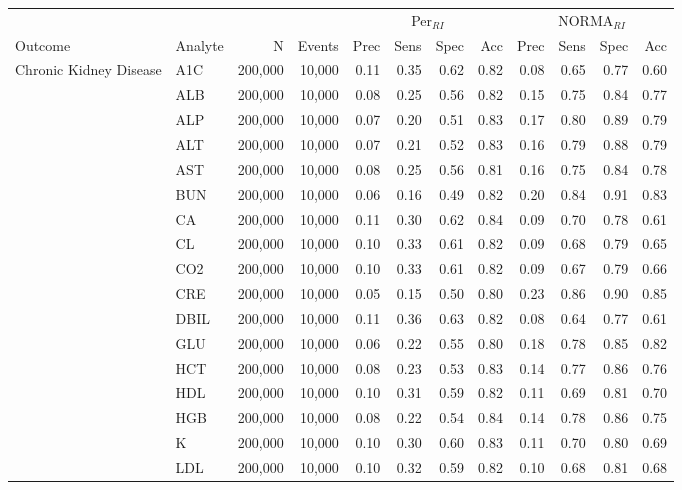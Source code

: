 \begin{table}[ht]
\centering
\footnotesize
\begin{tabular}{llrrrrrrrrrr}
\toprule
 & & &  & \multicolumn{4}{c}{Per$_{RI}$} & \multicolumn{4}{c}{NORMA$_{RI}$} \\
\cmidrule(lr){5-8} \cmidrule(lr){9-12}
Outcome & Analyte & N & Events & Prec & Sens & Spec & Acc & Prec & Sens & Spec & Acc \\
\midrule
Chronic Kidney Disease & A1C & 200,000 & 10,000 & 0.11 & 0.35 & 0.62 & 0.82 & 0.08 & 0.65 & 0.77 & 0.60 \\
 & ALB & 200,000 & 10,000 & 0.08 & 0.25 & 0.56 & 0.82 & 0.15 & 0.75 & 0.84 & 0.77 \\
 & ALP & 200,000 & 10,000 & 0.07 & 0.20 & 0.51 & 0.83 & 0.17 & 0.80 & 0.89 & 0.79 \\
 & ALT & 200,000 & 10,000 & 0.07 & 0.21 & 0.52 & 0.83 & 0.16 & 0.79 & 0.88 & 0.79 \\
 & AST & 200,000 & 10,000 & 0.08 & 0.25 & 0.56 & 0.81 & 0.16 & 0.75 & 0.84 & 0.78 \\
 & BUN & 200,000 & 10,000 & 0.06 & 0.16 & 0.49 & 0.82 & 0.20 & 0.84 & 0.91 & 0.83 \\
 & CA & 200,000 & 10,000 & 0.11 & 0.30 & 0.62 & 0.84 & 0.09 & 0.70 & 0.78 & 0.61 \\
 & CL & 200,000 & 10,000 & 0.10 & 0.33 & 0.61 & 0.82 & 0.09 & 0.68 & 0.79 & 0.65 \\
 & CO2 & 200,000 & 10,000 & 0.10 & 0.33 & 0.61 & 0.82 & 0.09 & 0.67 & 0.79 & 0.66 \\
 & CRE & 200,000 & 10,000 & 0.05 & 0.15 & 0.50 & 0.80 & 0.23 & 0.86 & 0.90 & 0.85 \\
 & DBIL & 200,000 & 10,000 & 0.11 & 0.36 & 0.63 & 0.82 & 0.08 & 0.64 & 0.77 & 0.61 \\
 & GLU & 200,000 & 10,000 & 0.06 & 0.22 & 0.55 & 0.80 & 0.18 & 0.78 & 0.85 & 0.82 \\
 & HCT & 200,000 & 10,000 & 0.08 & 0.23 & 0.53 & 0.83 & 0.14 & 0.77 & 0.86 & 0.76 \\
 & HDL & 200,000 & 10,000 & 0.10 & 0.31 & 0.59 & 0.82 & 0.11 & 0.69 & 0.81 & 0.70 \\
 & HGB & 200,000 & 10,000 & 0.08 & 0.22 & 0.54 & 0.84 & 0.14 & 0.78 & 0.86 & 0.75 \\
 & K & 200,000 & 10,000 & 0.10 & 0.30 & 0.60 & 0.83 & 0.11 & 0.70 & 0.80 & 0.69 \\
 & LDL & 200,000 & 10,000 & 0.10 & 0.32 & 0.59 & 0.82 & 0.10 & 0.68 & 0.81 & 0.68 \\

\end{tabular}
\end{table}
